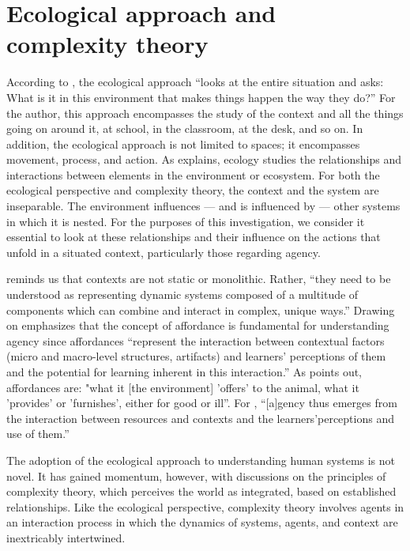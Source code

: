 \section{Ecological approach and complexity theory}\label{sec-Ecological approach and complexity theory}

According to \textcite[p. 11]{vanlier2004}, the ecological approach “looks at the entire situation and asks: What is it in this environment that makes things happen the way they do?” For the author, this approach encompasses the study of the context and all the things going on around it, at school, in the classroom, at the desk, and so on. In addition, the ecological approach is not limited to spaces; it encompasses movement, process, and action. As \textcite{vanlier2010a} explains, ecology studies the relationships and interactions between elements in the environment or ecosystem. For both the ecological perspective and complexity theory, the context and the system are inseparable. The environment influences — and is influenced by — other systems in which it is nested. For the purposes of this investigation, we consider it essential to look at these relationships and their influence on the actions that unfold in a situated context, particularly those regarding agency.


\textcite[p. 43]{mercer2012} reminds us that contexts are not static or monolithic. Rather, “they need to be understood as representing dynamic systems composed of a multitude of components which can combine and interact in complex, unique ways.” Drawing on \textcite{vanlier2004,mercer2012} emphasizes that the concept of affordance is fundamental for understanding agency since affordances “represent the interaction between contextual factors (micro and macro-level structures, artifacts) and learners' perceptions of them and the potential for learning inherent in this interaction.” As \textcite[p. 127]{gibson1986} points out, affordances are: "what it [the environment] 'offers' to the animal, what it 'provides' or 'furnishes', either for good or ill”. For \textcite[p. 43]{mercer2012} , “[a]gency thus emerges from the interaction between resources and contexts and the learners’perceptions and use of them.”


The adoption of the ecological approach to understanding human systems is not novel. It has gained momentum, however, with discussions on the principles of complexity theory, which perceives the world as integrated, based on established relationships. Like the ecological perspective, complexity theory involves agents in an interaction process in which the dynamics of systems, agents, and context are inextricably intertwined.

